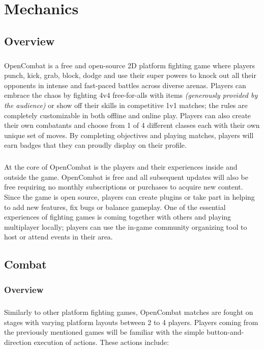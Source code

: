 \chapter{Mechanics}

\section{Overview}

\paragraph{} OpenCombat is a free and open-source 2D platform fighting game where players punch, kick, grab, block, dodge and use their super powers to knock out all their opponents in intense and fast-paced battles across diverse arenas. Players can embrace the chaos by fighting 4v4 free-for-alls with items \textit{(generously provided by the audience)} or show off their skills in competitive 1v1 matches; the rules are completely customizable in both offline and online play. Players can also create their own combatants and choose from 1 of 4 different classes each with their own unique set of moves. By completing objectives and playing matches, players will earn badges that they can proudly display on their profile.

\paragraph{} At the core of OpenCombat is the players and their experiences inside and outside the game. OpenCombat is free and all subsequent updates will also be free requiring no monthly subscriptions or purchases to acquire new content. Since the game is open source, players can create plugins or take part in helping to add new features, fix bugs or balance gameplay. One of the essential experiences of fighting games is coming together with others and playing multiplayer locally; players can use the in-game community organizing tool to host or attend events in their area.

\section{Combat}

\subsection{Overview}

\paragraph{} Similarly to other platform fighting games, OpenCombat matches are fought on stages with varying platform layouts between 2 to 4 players. Players coming from the previously mentioned games will be familiar with the simple button-and-direction execution of actions. These actions include:


